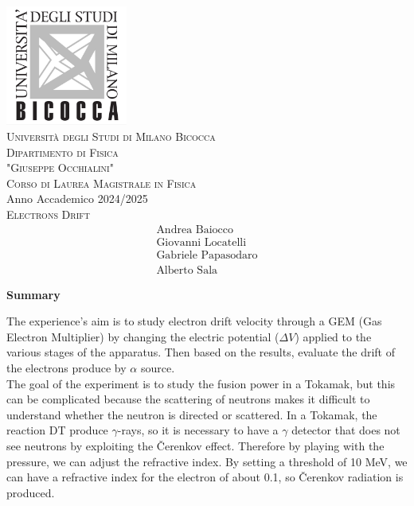 \documentclass[a4paper,twoside,openany]{book}
\begin{document}
	\begin{titlepage}
		\centering
		\includegraphics[width=0.3\textwidth]{university}\\
		\bigskip
		{\Large
		{\scshape Università degli Studi di Milano Bicocca}\\
		{\scshape Dipartimento di Fisica}\\
		{\scshape "Giuseppe Occhialini"}\\
		\bigskip
		{\scshape Corso di Laurea Magistrale in Fisica}\\}
		Anno Accademico 2024/2025\\
		\bigskip
		{\hfill\vfill{\scshape \Huge{\textcolor{maroon(html/css)}{Electrons Drift}}}\\}
		{\vfill
		\[	\begin{array}{c}
			\mbox{Andrea Baiocco}\\
			\mbox{Giovanni Locatelli}\\
			\mbox{Gabriele Papasodaro}\\
			\mbox{Alberto Sala}
			\end{array}	\]}
	\end{titlepage}

\newpage
\null
\thispagestyle{empty}
\newpage

\setcounter{page}{1}
\begin{center}\textbf{Summary}\\\end{center}
The experience's aim is to study electron drift velocity through a GEM (Gas Electron Multiplier) by changing the electric potential ($\Delta V$) applied to the various stages of the apparatus. Then based on the results, evaluate the drift of the electrons produce by $\alpha$ source.\\
The goal of the experiment is to study the fusion power in a Tokamak, but this can be complicated because the scattering of neutrons makes it difficult to understand whether the neutron is directed or scattered. In a Tokamak, the reaction DT produce $\gamma$-rays, so it is necessary to have a $\gamma$ detector that does not see neutrons by exploiting the Čerenkov effect. Therefore by playing with the pressure, we can adjust the refractive index. By setting a threshold of 10 MeV, we can have a refractive index for the electron of about 0.1, so Čerenkov radiation is produced.
\end{document}
